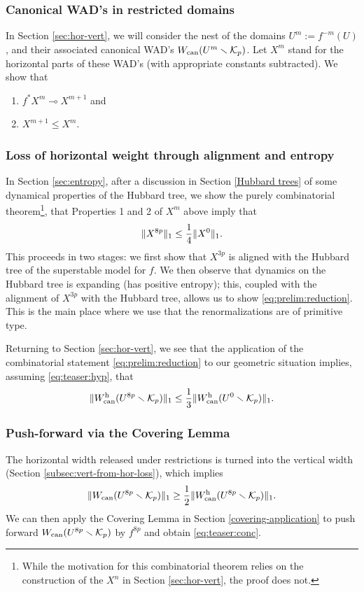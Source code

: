 \subsubsection{Canonical WAD's in restricted domains}
In Section \ref{sec:hor-vert},
we will consider the nest of the domains $U^m := f^{-m}(U)$,
and their associated canonical WAD's $W_{\operatorname{can}}(U^m \smallsetminus {\mathcal K}_p)$.
Let $X^m$ stand for the horizontal parts of these WAD's
(with appropriate constants subtracted).
We show that 
\begin{enumerate}
\item
$f^* X^m\multimap X^{m+1}$ and 
\item  $X^{m+1} \le X^m$. 
\end{enumerate}

\subsubsection{Loss of horizontal weight through alignment and entropy}
In Section \ref{sec:entropy},
after a discussion in Section \ref{Hubbard trees} of some dynamical properties of the Hubbard tree, 
we show the purely combinatorial theorem\footnote{While the motivation for this combinatorial theorem relies on the construction of the $X^n$ in Section \ref{sec:hor-vert}, the proof does not.}, 
that Properties 1 and 2 of $X^m$ above imply that 
\begin{equation} \label{eq:prelim:reduction}
\Vert X^{8p} \Vert_1 \le  \frac 14\Vert X^0 \Vert_1.
\end{equation}
This proceeds in two stages: we first show that $X^{3p}$ is aligned with the Hubbard tree 
of the superstable model for $f$. 
We then observe that dynamics on the Hubbard tree is expanding (has positive entropy);
this, 
coupled with the alignment of $X^{3p}$ with the Hubbard tree,
allows us to show \eqref{eq:prelim:reduction}.
This is the main place where we use that the renormalizations are
of primitive type.

Returning to Section \ref{sec:hor-vert},
we see that the application of the combinatorial statement \eqref{eq:prelim:reduction} to our geometric situation implies,
assuming \eqref{eq:teaser:hyp},
that
 $$
     \|W_{\mathrm{can}}^{\mathrm{h}}(U^{8p}\smallsetminus {\mathcal K}_p)\|_1 \leq \frac{1}{3} \| W^{\mathrm{h}}_{\mathrm{can}}(U^0 \smallsetminus {\mathcal K}_p) \|_1.
$$

\subsubsection{Push-forward via the Covering Lemma}
   The horizontal width released under restrictions is turned into the vertical  width (Section \ref{subsec:vert-from-hor-loss}),
which implies
$$
 \Vert W_{\mathrm{can}}(U^{8p} \smallsetminus{\mathcal K}_p) \Vert_1\geq  \frac{1}{2}\Vert W_{\mathrm{can}}^{\mathrm{h}}(U^{8p}\smallsetminus {\mathcal K}_p) \Vert_1.
$$
We can then apply the Covering Lemma\cite{covering lemma} in Section \ref{covering-application} to push forward $W_{\mathrm{can}}(U^{8p} \smallsetminus{\mathcal K}_p)$  by  $f^{8p}$
and obtain \eqref{eq:teaser:conc}.

